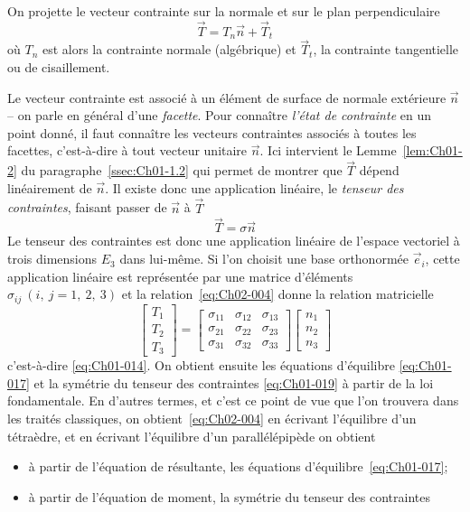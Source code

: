 On projette le vecteur contrainte sur la normale et sur le plan perpendiculaire
\begin{equation}
    \vec{T} = T_{n}\vec{n} + \vec{T}_{t}
    \label{eq:Ch02-003}
\end{equation}
où $T_n$ est alors la contrainte normale (algébrique) et $\vec{T}_t$, la contrainte tangentielle ou de cisaillement. 

Le vecteur contrainte est associé à un élément de surface de normale extérieure $\vec{n}$ -- on parle en général d'une \emph{facette}. 
Pour connaître \emph{l'état de contrainte} en un point donné, il faut connaître les vecteurs contraintes associés à toutes les facettes, c'est-à-dire à tout vecteur unitaire $\vec{n}$.
Ici intervient le Lemme~\ref{lem:Ch01-2} du paragraphe~\ref{ssec:Ch01-1.2} qui permet de montrer que $\vec{T}$ dépend linéairement de $\vec{n}$.
Il existe donc une application linéaire, le \emph{tenseur des contraintes}, faisant passer de $\vec{n}$ à $\vec{T}$
\begin{equation}
    \vec{T} = \mathbb{\sigma} \vec{n}
    \label{eq:Ch02-004}
\end{equation}
Le tenseur des contraintes est donc une application linéaire de l'espace vectoriel à trois dimensions $E_3$ dans lui-même.
Si l'on choisit une base orthonormée $\vec{e}_i$, cette application linéaire est représentée par une matrice d'éléments $\sigma_{ij}\ (i,\ j = 1,\ 2,\ 3)$  et la relation~\eqref{eq:Ch02-004} donne la relation matricielle
\begin{equation*}
    \begin{bmatrix}
        T_1\\
        T_2\\
        T_3
    \end{bmatrix}
    =
    \begin{bmatrix}
        \sigma_{11} & \sigma_{12} & \sigma_{13}\\
        \sigma_{21} & \sigma_{22} & \sigma_{23}\\
        \sigma_{31} & \sigma_{32} & \sigma_{33}
    \end{bmatrix}
    \begin{bmatrix}
        n_1\\
        n_2\\
        n_3
    \end{bmatrix}
\end{equation*}
c'est-à-dire \eqref{eq:Ch01-014}.
On obtient ensuite les équations d'équilibre \eqref{eq:Ch01-017} et la symétrie du tenseur des contraintes \eqref{eq:Ch01-019} à partir de la loi fondamentale. 
En d'autres termes, et c'est ce point de vue que l'on trouvera dans les traités classiques, on obtient~\eqref{eq:Ch02-004} en écrivant l'équilibre d'un tétraèdre, et en écrivant l'équilibre d'un parallélépipède on obtient 
\begin{itemize}
    \item à partir de l'équation de résultante, les équations d'équilibre~\eqref{eq:Ch01-017};
    \item à partir de l'équation de moment, la symétrie du tenseur des contraintes
\end{itemize}

